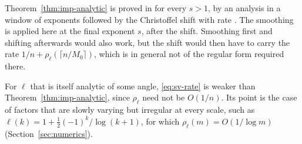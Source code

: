 \begin{remark}\label{rem:order}
Theorem~\ref{thm:imp-analytic} is proved in \cite{PaperII} for every $s>1$, by an analysis in a window of exponents
followed by the Christoffel shift with rate \cite[Theorem~3.1]{PaperII}. The smoothing is applied here at the final
exponent $s$, after the shift. Smoothing first and shifting afterwards would also work, but the shift would then
have to carry the rate $1/n+\rho_\ell(\lceil n/M_0\rceil)$, which is in general not of the regular form required
there.
\end{remark}

\begin{remark}\label{rem:rate}
For $\ell$ that is itself analytic of some angle, \eqref{eq:sv-rate} is weaker than Theorem~\ref{thm:imp-analytic},
since $\rho_\ell$ need not be $O(1/n)$. Its point is the case of factors that are slowly varying but irregular at
every scale, such as $\ell(k)=1+\frac12(-1)^k/\log(k+1)$, for which $\rho_\ell(m)=O(1/\log m)$
(Section~\ref{sec:numerics}).
\end{remark}
